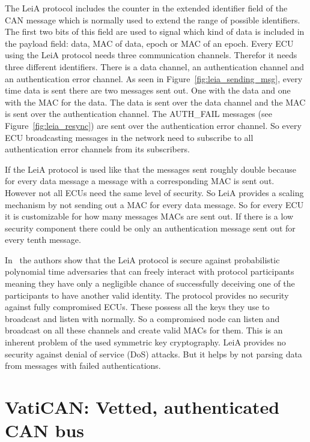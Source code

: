 The LeiA protocol includes the counter in the extended identifier field of the
CAN message which is normally used to extend the range of possible identifiers.
The first two bits of this field are used to signal which kind of data is
included in the payload field: data, MAC of data, epoch or MAC of an epoch.
Every ECU using the LeiA protocol needs three communication channels. Therefor
it needs three different identifiers. There is a data channel, an authentication
channel and an authentication error channel. As seen in Figure~\ref{fig:leia_sending_msg}, every time data is sent there are two messages sent
out. One with the data and one with the MAC for the data. The data is sent over
the data channel and the MAC is sent over the authentication channel. The
AUTH\_FAIL messages (see Figure~\ref{fig:leia_resync}) are sent over the
authentication error channel. So every ECU broadcasting messages in the network
need to subscribe to all authentication error channels from its subscribers.

\smallskip
If the LeiA protocol is used like that the messages sent roughly double because
for every data message a message with a corresponding MAC is sent out. However
not all ECUs need the same level of security. So LeiA provides a scaling
mechanism by not sending out a MAC for every data message. So for every ECU it
is customizable for how many messages MACs are sent out. If there is a low
security component there could be only an authentication message sent out for
every tenth message.

\smallskip
In~\cite{Radu2016} the authors show that the LeiA protocol is secure against
probabilistic polynomial time adversaries that can freely interact with protocol
participants meaning they have only a negligible chance of successfully
deceiving one of the participants to have another valid identity. The protocol
provides no security against fully compromised ECUs. These possess all the keys
they use to broadcast and listen with normally. So a compromised node can listen
and broadcast on all these channels and create valid MACs for them. This is an
inherent problem of the used symmetric key cryptography. LeiA provides no
security against denial of service (DoS) attacks. But it helps by not parsing
data from messages with failed authentications.

\section{VatiCAN: Vetted, authenticated CAN bus}\label{subsec:vatican}


